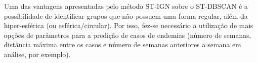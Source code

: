 Uma das vantagens apresentadas pelo método ST-IGN sobre o ST-DBSCAN é a possibilidade de identificar grupos que não possuem uma forma regular, além da hiper-esférica (ou esférica/circular). Por isso, fez-se necessário a utilização de mais opções de parâmetros para a predição de casos de endemias (número de semanas, distância máxima entre os casos e número de semanas anteriores a semana em análise, por exemplo).
